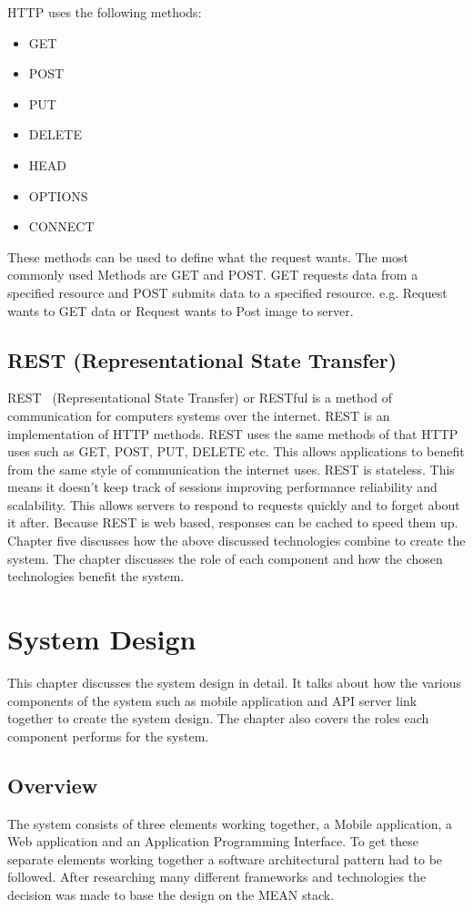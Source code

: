 HTTP uses the following methods: 
\begin{itemize}
\item GET
\item POST
\item PUT
\item DELETE
\item HEAD
\item OPTIONS
\item CONNECT
\end{itemize}
	
These methods can be used to define what the request wants. The most commonly used Methods are GET and POST. GET requests data from a specified resource and POST submits data to a specified resource. e.g. Request wants to GET data or Request wants to Post image to server.


\section{REST (Representational State Transfer)}
REST~\cite{REST} (Representational State Transfer) or RESTful is a method of communication for computers systems over the internet. REST is an implementation of HTTP methods. REST uses the same methods of that HTTP uses such as GET, POST, PUT, DELETE etc. This allows applications to benefit from the same style of communication the internet uses.
REST is stateless. This means it doesn't keep track of sessions improving performance reliability and scalability. This allows servers to respond to requests quickly and to forget about it after. Because REST is web based, responses can be cached to speed them up. \\


Chapter five discusses how the above discussed technologies combine to create the system. The chapter discusses the role of each component and how the chosen technologies benefit the system.




\chapter{System Design}
This chapter discusses the system design in detail. It talks about how the various components of the system such as mobile application and API server link together to create the system design. The chapter also covers the roles each component performs for the system.

\section{Overview}
The system consists of three elements working together, a Mobile application, a Web application and an Application Programming Interface. To get these separate elements working together a software architectural pattern had to be followed. After researching many different frameworks and technologies the decision was made to base the design on the MEAN stack. 

